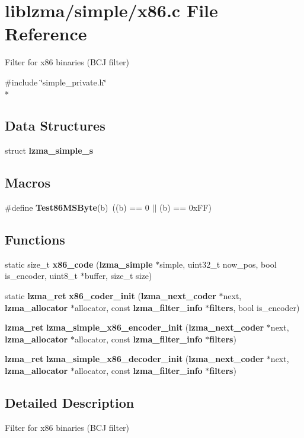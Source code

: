 \section{liblzma/simple/x86.c File Reference}
\label{x86_8c}


Filter for x86 binaries (B\-C\-J filter)  


{\ttfamily \#include \char`\"{}simple\-\_\-private.\-h\char`\"{}}\\*
\subsection*{Data Structures}
\begin{DoxyCompactItemize}
\item 
struct {\bf lzma\-\_\-simple\-\_\-s}
\end{DoxyCompactItemize}
\subsection*{Macros}
\begin{DoxyCompactItemize}
\item 
\#define {\bfseries Test86\-M\-S\-Byte}(b)~((b) == 0 $|$$|$ (b) == 0x\-F\-F)\label{x86_8c_a6297dcbe891ec71408be96c4bd80fb44}

\end{DoxyCompactItemize}
\subsection*{Functions}
\begin{DoxyCompactItemize}
\item 
static size\-\_\-t {\bfseries x86\-\_\-code} ({\bf lzma\-\_\-simple} $\ast$simple, uint32\-\_\-t now\-\_\-pos, bool is\-\_\-encoder, uint8\-\_\-t $\ast$buffer, size\-\_\-t size)\label{x86_8c_a1f268e2656917a78f836284f9b874c8f}

\item 
static {\bf lzma\-\_\-ret} {\bfseries x86\-\_\-coder\-\_\-init} ({\bf lzma\-\_\-next\-\_\-coder} $\ast$next, {\bf lzma\-\_\-allocator} $\ast$allocator, const {\bf lzma\-\_\-filter\-\_\-info} $\ast${\bf filters}, bool is\-\_\-encoder)\label{x86_8c_a8bcf6df417cf7749ce22b74b31f73961}

\item 
{\bf lzma\-\_\-ret} {\bfseries lzma\-\_\-simple\-\_\-x86\-\_\-encoder\-\_\-init} ({\bf lzma\-\_\-next\-\_\-coder} $\ast$next, {\bf lzma\-\_\-allocator} $\ast$allocator, const {\bf lzma\-\_\-filter\-\_\-info} $\ast${\bf filters})\label{x86_8c_a69ee1b7153ed8024a2aa3c5825b077b0}

\item 
{\bf lzma\-\_\-ret} {\bfseries lzma\-\_\-simple\-\_\-x86\-\_\-decoder\-\_\-init} ({\bf lzma\-\_\-next\-\_\-coder} $\ast$next, {\bf lzma\-\_\-allocator} $\ast$allocator, const {\bf lzma\-\_\-filter\-\_\-info} $\ast${\bf filters})\label{x86_8c_a4fe7b78ecbed6ff2421208c05ad4eaa1}

\end{DoxyCompactItemize}


\subsection{Detailed Description}
Filter for x86 binaries (B\-C\-J filter) 